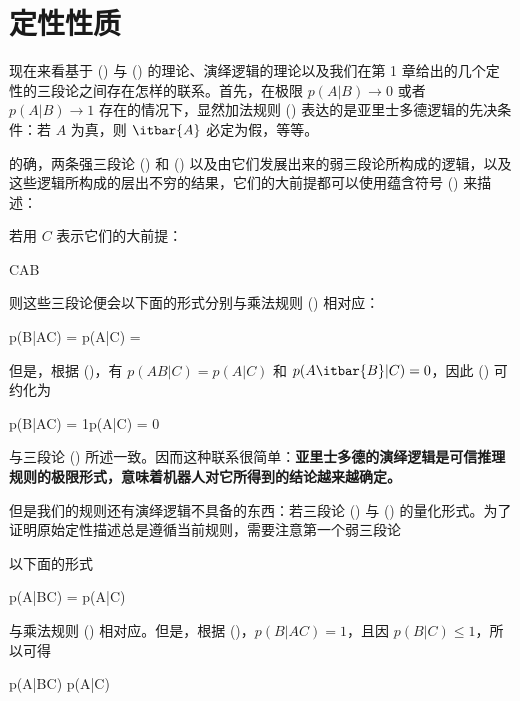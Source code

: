 \section{定性性质}

现在来看基于 (\in[2-63]) 与 (\in[2-64]) 的理论、演绎逻辑的理论以及我们在第 1 章给出的几个定性的三段论之间存在怎样的联系。首先，在极限 $p(A|B)\rightarrow 0$ 或者 $p(A|B) \rightarrow 1$ 存在的情况下，显然加法规则 (\in[2-64]) 表达的是亚里士多德逻辑的先决条件：若 $A$ 为真，则 $\itbar{A}$ 必定为假，等等。

的确，两条强三段论 (\in[syllogism-1]) 和 (\in[syllogism-2]) 以及由它们发展出来的弱三段论所构成的逻辑，以及这些逻辑所构成的层出不穷的结果，它们的大前提都可以使用蕴含符号 (\in[implication]) 来描述：

\placeformula[2-68]
\startformula
{}\quad\quad{}\NR
\stopformula

若用 $C$ 表示它们的大前提：

\placeformula[2-69]
\startformula
C\equiv A\Rightarrow B
\stopformula

则这些三段论便会以下面的形式分别与乘法规则 (\in[2-63]) 相对应：

\placeformula[2-70]
\startformula
p(B|AC) = \quad\quad p(A|C) = 
\stopformula

但是，根据 (\in[2-68])，有 $p(AB|C) = p(A|C)$ 和 $p(A\itbar{B}|C) = 0$，因此 (\in[2-70]) 可约化为

\placeformula[2-71]
\startformula
p(B|AC) = 1\quad\quad p(A|C) = 0
\stopformula

与三段论 (\in[2-68]) 所述一致。因而这种联系很简单：{\bf 亚里士多德的演绎逻辑是可信推理规则的极限形式，意味着机器人对它所得到的结论越来越确定。}

但是我们的规则还有演绎逻辑不具备的东西：若三段论 (\in[weak-1]) 与 (\in[weak-2]) 的量化形式。为了证明原始定性描述总是遵循当前规则，需要注意第一个弱三段论

\placeformula[2-72]
\startformula
{}
\stopformula

以下面的形式

\placeformula[2-73]
\startformula
p(A|BC) = p(A|C)
\stopformula

与乘法规则 (\in[2-63]) 相对应。但是，根据 (\in[2-68])，$p(B|AC) = 1$，且因 $p(B|C)\le 1$，所以可得

\placeformula[2-74]
\startformula
p(A|BC) \ge p(A|C)
\stopformula

